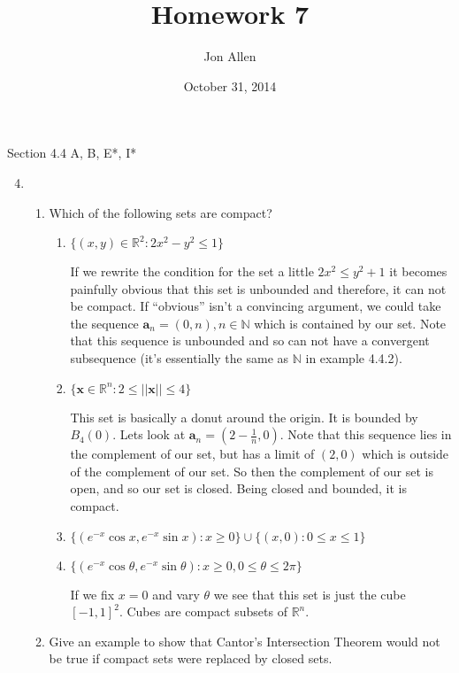 \documentclass[letterpaper]{article}
\begin{document}
\title{Homework 7}
\date{October 31, 2014}
\author{Jon Allen}
\maketitle
Section 4.4  A, B, E*, I*
\renewcommand{\labelenumi}{4.\arabic{enumi}}
\renewcommand{\labelenumii}{\Alph{enumii}.}
\renewcommand{\labelenumiii}{(\alph{enumiii})}
\begin{enumerate}
\setcounter{enumi}{3}
\item
  \begin{enumerate}
  \item
    Which of the following sets are compact?
    \begin{enumerate}
    \item
      $\{(x,y)\in\mathbb{R}^2:2x^{2}-y^{2}\le 1\}$

      If we rewrite the condition for the set a little $2x^2\le y^2+1$ it becomes painfully obvious that this set is unbounded and therefore, it can not be compact.
      If ``obvious'' isn't a convincing argument, we could take the sequence $\boldsymbol{a}_n=(0,n), n\in \mathbb{N}$ which is contained by our set. Note that this sequence is unbounded and so can not have a convergent subsequence (it's essentially the same as $\mathbb{N}$ in example 4.4.2).
    \item
      $\{\boldsymbol{x}\in\mathbb{R}^n:2\le||\boldsymbol{x}||\le4\}$

      This set is basically  a donut around the origin. It is bounded by $B_4(0)$. Lets look at $\boldsymbol{a}_n=(2-\frac{1}{n},0)$. Note that this sequence lies in the complement of our set, but has a limit of $(2,0)$ which is outside of the complement of our set. So  then the complement of our set is open, and so our set is closed. Being closed and bounded, it is compact.
    \item
      $\{(e^{-x}\cos x,e^{-x}\sin x):x\ge 0\}\cup\{(x,0):0\le x\le 1\}$
    \item
      $\{(e^{-x}\cos \theta,e^{-x}\sin \theta):x\ge0,0\le\theta\le2\pi\}$

      If we fix $x=0$ and vary $\theta$ we see that this set is just the cube $[-1,1]^2$. Cubes are compact subsets of $\mathbb{R}^n$.
    \end{enumerate}
  \item
    Give an example to show that Cantor's Intersection Theorem would not be true if compact sets were replaced by closed sets.


\end{enumerate}
\end{enumerate}
\end{document}
